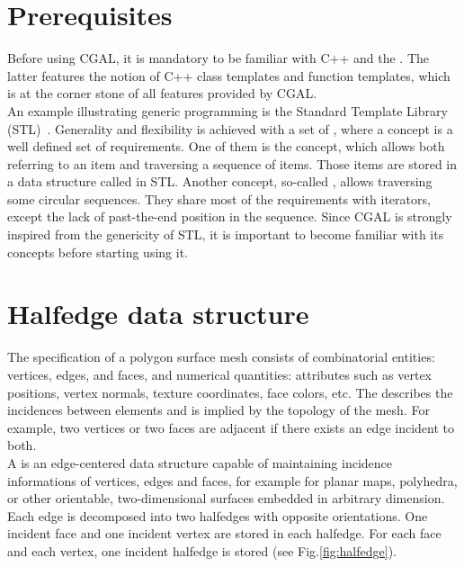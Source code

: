 \documentclass[letter,twoside,10pt]{article}
\begin{document}
\section{Prerequisites}


Before using CGAL, it is mandatory to be familiar with C++ and the
. The latter features the notion
of C++ class templates and function templates, which is at the corner
stone of all features provided by CGAL.\\


An example illustrating generic programming is the Standard Template
Library (STL)~\cite{ms-stl-96}. Generality and flexibility is achieved
with a set of , where a concept is a well defined set
of requirements. One of them is the  concept, which
allows both referring to an item and traversing a sequence of
items. Those items are stored in a data structure called
 in STL. Another concept, so-called
, allows traversing some circular sequences. They
share most of the requirements with iterators, except the lack of
past-the-end position in the sequence. Since CGAL is strongly inspired
from the genericity of STL, it is important to become familiar with
its concepts before starting using it.

\section{Halfedge data structure}

The specification of a polygon surface mesh consists of combinatorial
entities: vertices, edges, and faces, and numerical quantities:
attributes such as vertex positions, vertex normals, texture
coordinates, face colors, etc. The  describes the
incidences between elements and is implied by the topology of the
mesh. For example, two vertices or two faces are adjacent if there
exists an edge incident to both.\\


A  is an edge-centered data structure
capable of maintaining incidence informations of vertices, edges and
faces, for example for planar maps, polyhedra, or other orientable,
two-dimensional surfaces embedded in arbitrary dimension. Each edge is
decomposed into two halfedges with opposite orientations. One incident
face and one incident vertex are stored in each halfedge. For each
face and each vertex, one incident halfedge is stored (see
Fig.\ref{fig:halfedge}).
\end{document}
